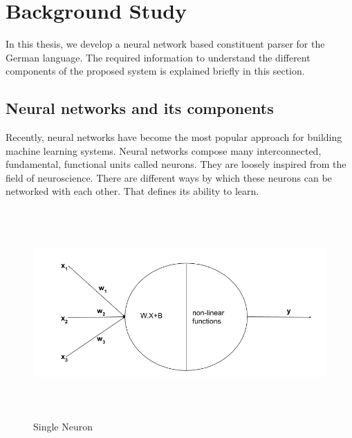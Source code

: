 \documentclass[a4paper, 11pt]{article}
\begin{document}




\pagebreak
\section{Background Study}
 In this thesis, we develop a neural network based constituent parser for the German language. The required information to understand the different components of the proposed system is explained briefly in this section. 

\subsection{Neural networks and its components}

Recently, neural networks have become the most popular approach for building machine learning systems. Neural networks compose many interconnected, fundamental, functional units called neurons. They are loosely inspired from the field of neuroscience. There are different ways by which these neurons can be networked with each other. That defines its ability to learn. 

\begin{figure}[H]
    \centering
    \includegraphics[width=\textwidth,height=8cm,keepaspectratio=true]
    {single-neuron.png}
    \caption{
        Single Neuron
    }
    \label{fig:single_neuron}
\end{figure}
\end{document}
